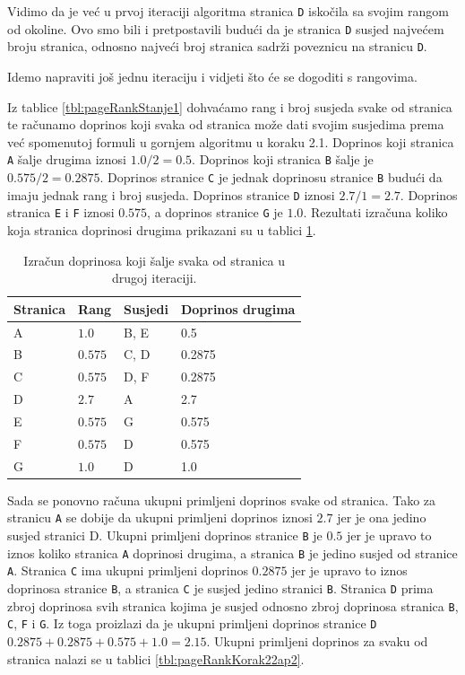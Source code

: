 \documentclass[times, utf8, zavrsni, numeric]{fer}
\begin{document}
Vidimo da je već u prvoj iteraciji algoritma stranica \texttt{D} iskočila sa svojim rangom od okoline. Ovo smo bili i pretpostavili budući da je stranica \texttt{D} susjed najvećem broju stranica, odnosno najveći broj stranica sadrži poveznicu na stranicu \texttt{D}. 

Idemo napraviti još jednu iteraciju i vidjeti što će se dogoditi s rangovima. 

Iz tablice \ref{tbl:pageRankStanje1} dohvaćamo rang i broj susjeda svake od stranica te računamo doprinos koji svaka od stranica može dati svojim susjedima prema već spomenutoj formuli u gornjem algoritmu u koraku 2.1. Doprinos koji stranica \texttt{A} šalje drugima iznosi $1.0 / 2 = 0.5$. Doprinos koji stranica \texttt{B} šalje je $0.575 / 2 = 0.2875$. Doprinos stranice \texttt{C} je jednak doprinosu stranice \texttt{B} budući da imaju jednak rang i broj susjeda. Doprinos stranice \texttt{D} iznosi $2.7 / 1 = 2.7$. Doprinos stranica \texttt{E} i \texttt{F} iznosi $0.575$, a doprinos stranice \texttt{G} je $1.0$. Rezultati izračuna koliko koja stranica doprinosi drugima prikazani su u tablici \ref{tbl:pageRankKorak21p2}.

\begin{table}[htb]
\caption{Izračun doprinosa koji šalje svaka od stranica u drugoj iteraciji.}
\label{tbl:pageRankKorak21p2}
\centering
\begin{tabular}{llll} 
\hline
Stranica & Rang & Susjedi & Doprinos drugima\\
\hline
A & $1.0$ & B, E & 0.5\\
B & $0.575$ & C, D & 0.2875\\
C & $0.575$ & D, F & 0.2875\\
D & $2.7$ & A & 2.7\\
E & $0.575$ & G & 0.575\\
F & $0.575$ & D & 0.575\\
G & $1.0$ & D & 1.0\\
\hline
\end{tabular}
\end{table}

Sada se ponovno računa ukupni primljeni doprinos svake od stranica. Tako za stranicu \texttt{A} se dobije da ukupni primljeni doprinos iznosi $2.7$ jer je ona jedino susjed stranici D. Ukupni primljeni doprinos stranice \texttt{B} je $0.5$ jer je upravo to iznos koliko stranica \texttt{A} doprinosi drugima, a stranica \texttt{B} je jedino susjed od stranice \texttt{A}. Stranica \texttt{C} ima ukupni primljeni doprinos $0.2875$ jer je upravo to iznos doprinosa stranice \texttt{B}, a stranica \texttt{C} je susjed jedino stranici \texttt{B}. Stranica \texttt{D} prima zbroj doprinosa svih stranica kojima je susjed odnosno zbroj doprinosa stranica \texttt{B}, \texttt{C}, \texttt{F} i \texttt{G}. Iz toga proizlazi da je ukupni primljeni doprinos stranice \texttt{D} $0.2875 + 0.2875 + 0.575 + 1.0 = 2.15$. Ukupni primljeni doprinos za svaku od stranica nalazi se u tablici \ref{tbl:pageRankKorak22ap2}.
\end{document}

